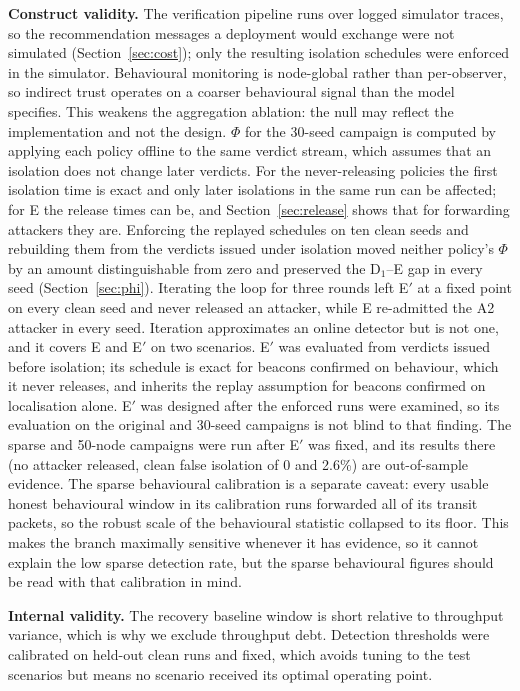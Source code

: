 \textbf{Construct validity.} The verification pipeline runs over logged
simulator traces, so the recommendation messages a deployment would exchange
were not simulated (Section~\ref{sec:cost}); only the resulting isolation
schedules were enforced in the simulator. Behavioural monitoring is
node-global rather than per-observer, so indirect trust operates on a coarser behavioural signal than
the model specifies. This weakens the aggregation ablation: the null may
reflect the implementation and not the design. $\Phi$ for the 30-seed
campaign is computed by applying each policy offline to the same verdict
stream, which assumes that an isolation does not change later verdicts. For
the never-releasing policies the first isolation time is exact and only later
isolations in the same run can be affected; for E the release times can be,
and Section~\ref{sec:release} shows that for forwarding attackers they are.
Enforcing the replayed schedules on ten clean seeds and rebuilding them from
the verdicts issued under isolation moved neither policy's $\Phi$ by an amount
distinguishable from zero and preserved the D$_1$--E gap in every seed
(Section~\ref{sec:phi}). Iterating the loop for three rounds left E$'$ at a
fixed point on every clean seed and never released an attacker, while E
re-admitted the A2 attacker in every seed. Iteration approximates an online
detector but is not one, and it covers E and E$'$ on two scenarios. E$'$ was evaluated from verdicts
issued before isolation; its schedule is exact for beacons confirmed on
behaviour, which it never releases, and inherits the replay assumption for
beacons confirmed on localisation alone. E$'$ was designed after the
enforced runs were examined, so its evaluation on the original and 30-seed
campaigns is not blind to that finding. The sparse and 50-node campaigns were
run after E$'$ was fixed, and its results there (no attacker released, clean
false isolation of 0 and 2.6\%) are out-of-sample evidence. The sparse
behavioural calibration is a separate caveat: every usable honest behavioural
window in its calibration runs forwarded all of its transit packets, so the
robust scale of the behavioural statistic collapsed to its floor. This makes
the branch maximally sensitive whenever it has evidence, so it cannot explain
the low sparse detection rate, but the sparse behavioural figures should be
read with that calibration in mind.

\textbf{Internal validity.} The recovery baseline window is short relative to
throughput variance, which is why we exclude throughput debt. Detection
thresholds were calibrated on held-out clean runs and fixed, which avoids
tuning to the test scenarios but means no scenario received its optimal
operating point.

